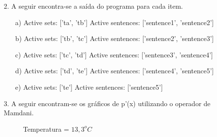 \documentclass{report}
\begin{document}
\newpage





\begin{enumerate}
\item[2.]
    A seguir encontra-se a saída do programa para cada item.

    \begin{itemize}
    \item[a)] 
        Active sets: ['ta', 'tb']
        Active sentences: ['sentence1', 'sentence2']
    \item[b)] 
        Active sets: ['tb', 'tc']
        Active sentences: ['sentence2', 'sentence3']
    \item[c)] 
        Active sets: ['tc', 'td']
        Active sentences: ['sentence3', 'sentence4']
    \item[d)] 
        Active sets: ['td', 'te']
        Active sentences: ['sentence4', 'sentence5']
    \item[e)] 
        Active sets: ['te']
        Active sentences: ['sentence5']
    \end{itemize}

\item[3.] A seguir encontram-se os gráficos de p'(x) utilizando o operador de Mamdani.

\begin{figure}[h!]
\begin{center}
    \end{center}
    \caption{Temperatura = $13,3^oC$}
\end{figure}



\end{enumerate}
\end{document}
